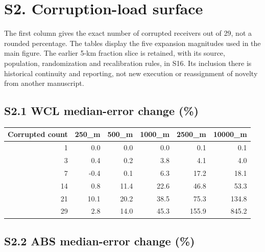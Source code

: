 \documentclass[journal,onecolumn,10pt]{IEEEtran}
\begin{document}
\section*{S2. Corruption-load surface}\label{s2.-paper-b-exclusive-corruption-load-surface}

The first column gives the exact number of corrupted receivers out of 29, not a rounded percentage. The tables display the five expansion magnitudes used in the main figure. The earlier 5-km fraction slice is retained, with its source, population, randomization and recalibration rules, in S16. Its inclusion there is historical continuity and reporting, not new execution or reassignment of novelty from another manuscript.

\subsection*{S2.1 WCL median-error change (\%)}\label{s2.1-wcl-median-error-change}

\begin{center}\begin{minipage}{\textwidth}\centering
{}

\begin{tabular}{@{}rrrrrr@{}}
\toprule\noalign{}
Corrupted count & 250\_m & 500\_m & 1000\_m & 2500\_m & 10000\_m \\
\midrule\noalign{}

1 & 0.0 & 0.0 & 0.0 & 0.1 & 0.1 \\
3 & 0.4 & 0.2 & 3.8 & 4.1 & 4.0 \\
7 & -0.4 & 0.1 & 6.3 & 17.2 & 18.1 \\
14 & 0.8 & 11.4 & 22.6 & 46.8 & 53.3 \\
21 & 10.1 & 20.2 & 38.5 & 75.3 & 134.8 \\
29 & 2.8 & 14.0 & 45.3 & 155.9 & 845.2 \\
\bottomrule
\end{tabular}
\end{minipage}\end{center}

\subsection*{S2.2 ABS median-error change (\%)}\label{s2.2-abs-median-error-change}
\end{document}
